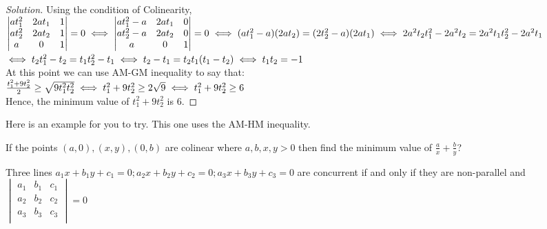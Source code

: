 \begin{proof}
[Solution]
    Using the condition of Colinearity, $\begin{vmatrix}
        at^2_1 & 2at_1 & 1\\
        at^2_2 & 2at_2 & 1\\
        a & 0 & 1\\
    \end{vmatrix} = 0\\
    \iff \begin{vmatrix}
        at^2_1-a & 2at_1 & 0\\
        at^2_2-a & 2at_2 & 0\\
        a & 0 & 1\\
    \end{vmatrix} = 0\\
    \iff (at^2_1-a)(2at_2)=(2t^2_2-a)(2at_1)\\
    \iff 2a^2t_2t^2_1-2a^2t_2=2a^2t_1t^2_2-2a^2t_1\\
    $$\iff t_2t^2_1-t_2=t_1t^2_2-t_1\\
    \iff t_2-t_1=t_2t_1(t_1-t_2)\\
    \iff t_1t_2=-1$\\
    At this point we can use AM-GM inequality to say that:\\
    $\frac{t_1^2+9t_2^2}{2} \geq \sqrt{9t_1^2t_2^2}\\
    \iff t_1^2+9t_2^2 \geq 2\sqrt{9}\\
    \iff t_1^2+9t_2^2 \geq 6$\\
    Hence, the minimum value of $t_1^2+9t_2^2$ is 6.
\end{proof}
Here is an example for you to try. This one uses the AM-HM inequality.\\
\begin{example}
If the points $(a, 0), (x, y), (0, b)$ are colinear where
$a, b, x, y > 0$ then find the minimum value of $\frac{a}{x}+\frac{b}{y}$?
\end{example}
\begin{theorem}
    Three lines $a_1x+b_1y+c_1=0; a_2x+b_2y+c_2=0; a_3x+b_3y+c_3=0$ are concurrent if and only if they are non-parallel and $\begin{vmatrix}
        a_1 & b_1 & c_1\\
        a_2 & b_2 & c_2\\
        a_3 & b_3 & c_3\\
    \end{vmatrix}=0$
\end{theorem}
